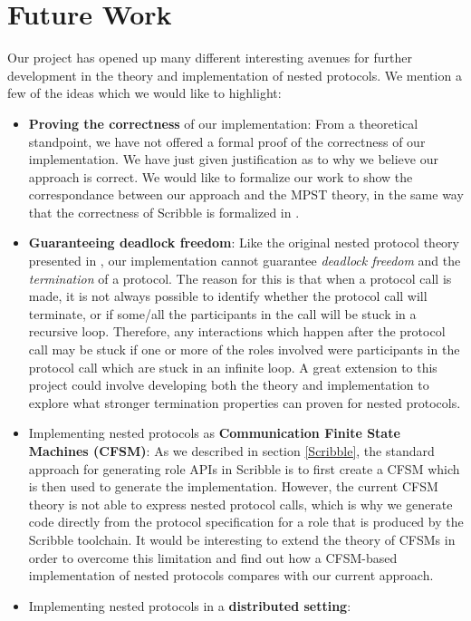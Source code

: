 \documentclass[12pt,twoside]{report}
\begin{document}
\section{Future Work}
Our project has opened up many different interesting avenues for further development in the theory and implementation of nested protocols. We mention a few of the ideas which we would like to highlight:
\begin{itemize}
    \item \textbf{Proving the correctness} of our implementation: From a theoretical standpoint, we have not offered a formal proof of the correctness of our implementation. We have just given justification as to why we believe our approach is correct. We would like to formalize our work to show the correspondance between our approach and the MPST theory, in the same way that the correctness of Scribble is formalized in \cite{featherweight}.
    \item \textbf{Guaranteeing deadlock freedom}: Like the original nested protocol theory presented in \cite{nestedprotocols}, our implementation cannot guarantee \textit{deadlock freedom} and the \textit{termination} of a protocol. The reason for this is that when a protocol call is made, it is not always possible to identify whether the protocol call will terminate, or if some/all the participants in the call will be stuck in a recursive loop. Therefore, any interactions which happen after the protocol call may be stuck if one or more of the roles involved were participants in the protocol call which are stuck in an infinite loop. A great extension to this project could involve developing both the theory and implementation to explore what stronger termination properties can proven for nested protocols.
    \item Implementing nested protocols as \textbf{Communication Finite State Machines (CFSM)}: As we described in section \ref{Scribble}, the standard approach for generating role APIs in Scribble is to first create a CFSM which is then used to generate the implementation. However, the current CFSM theory is not able to express nested protocol calls, which is why we generate code directly from the protocol specification for a role that is produced by the Scribble toolchain. It would be interesting to extend the theory of CFSMs in order to overcome this limitation and find out how a CFSM-based implementation of nested protocols compares with our current approach.
    \item Implementing nested protocols in a \textbf{distributed setting}:

\end{itemize}
\end{document}
